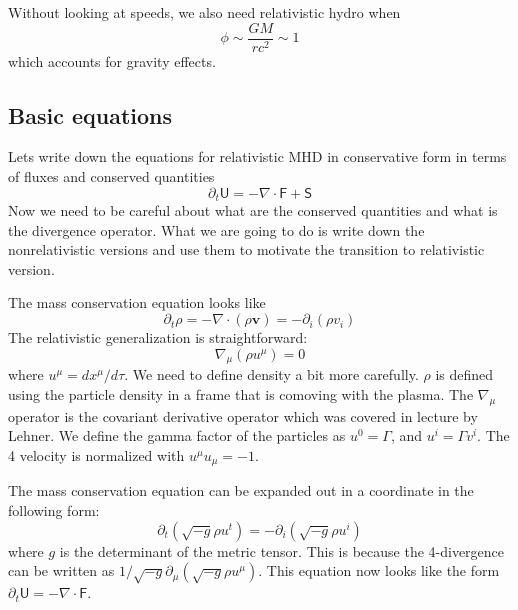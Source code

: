 \documentclass[letterpaper, 11pt]{article}
\numberwithin{equation}{section}
\numberwithin{figure}{section}
\begin{document}
Without looking at speeds, we also need relativistic hydro when
\begin{equation}
  \label{eq:21}
  \phi \sim \frac{GM}{rc^2} \sim 1
\end{equation}
which accounts for gravity effects.

\subsection{Basic equations}

Lets write down the equations for relativistic MHD in conservative form in terms
of fluxes and conserved quantities
\begin{equation}
  \label{eq:22}
  \partial_t\mathsf{U} = -\nabla\cdot \mathsf{F} + \mathsf{S}
\end{equation}
Now we need to be careful about what are the conserved quantities and what is
the divergence operator. What we are going to do is write down the
nonrelativistic versions and use them to motivate the transition to relativistic
version.

The mass conservation equation looks like
\begin{equation}
  \label{eq:23}
  \partial_t\rho = -\nabla\cdot(\rho \mathbf{v}) = -\partial_i(\rho v_i)
\end{equation}
The relativistic generalization is straightforward:
\begin{equation}
  \label{eq:24}
  \nabla_{\mu}(\rho u^{\mu}) = 0
\end{equation}
where $u^{\mu} = dx^{\mu}/d\tau$. We need to define density a bit more
carefully. $\rho$ is defined using the particle density in a frame that is
comoving with the plasma. The $\nabla_{\mu}$ operator is the covariant
derivative operator which was covered in lecture by Lehner. We define the gamma
factor of the particles as $u^0 = \Gamma$, and $u^i = \Gamma v^{i}$. The 4
velocity is normalized with $u^{\mu}u_{\mu} = -1$.

The mass conservation equation can be expanded out in a coordinate in the
following form:
\begin{equation}
  \label{eq:25}
  \partial_t(\sqrt{-g}\rho u^t) = -\partial_i(\sqrt{-g}\rho u^i)
\end{equation}
where $g$ is the determinant of the metric tensor. This is because the
4-divergence can be written as $1/\sqrt{-g}\partial_{\mu}(\sqrt{-g}\rho
u^{\mu})$. This equation now looks like the form $\partial_t\mathsf{U} =
-\nabla\cdot \mathsf{F}$.
\end{document}
